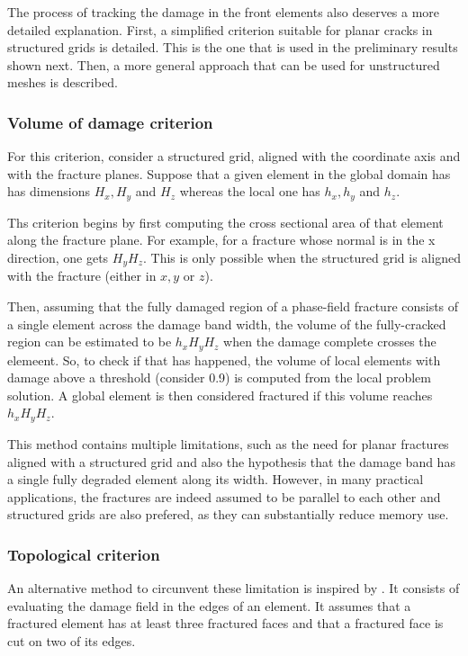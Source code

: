 The process of tracking the damage in the front elements also deserves a more detailed explanation. First, a simplified criterion suitable for planar cracks in structured grids is detailed. This is the one that is used in the preliminary results shown next. Then, a more general approach that can be used for unstructured meshes is described.

\subsubsection{Volume of damage criterion}

For this criterion, consider a structured grid, aligned with the coordinate axis and with the fracture planes. Suppose that a given element in the global domain has has dimensions $H_x, H_y$ and $H_z$ whereas the local one has $h_x, h_y$ and $h_z$.

Ths criterion begins by first computing the cross sectional area of that element along the fracture plane. For example, for a fracture whose normal is in the x direction, one gets $H_yH_z$. This is only possible when the structured grid is aligned with the fracture (either in $x, y$ or $z$).

Then, assuming that the fully damaged region of a phase-field fracture consists of a single element across the damage band width, the volume of the fully-cracked region can be estimated to be $h_xH_yH_z$ when the damage complete crosses the elemeent. So, to check if that has happened, the volume of local elements with damage above a threshold (consider 0.9) is computed from the local problem solution. A global element is then considered fractured if this volume reaches $h_xH_yH_z$.

This method contains multiple limitations, such as the need for planar fractures aligned with a structured grid and also the hypothesis that the damage band has a single fully degraded element along its width. However, in many practical applications, the fractures are indeed assumed to be parallel to each other and structured grids are also prefered, as they can substantially reduce memory use. 

\subsubsection{Topological criterion}

An alternative method to circunvent these limitation is inspired by \cite{muixi2021combined}. It consists of evaluating the damage field in the edges of an element. It assumes that a fractured element has at least three fractured faces and that a fractured face is cut on two of its edges.

